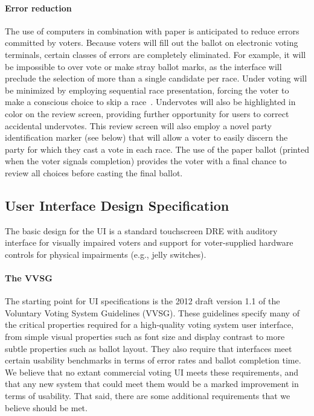 \paragraph{Error reduction} 
The use of computers in combination with paper is anticipated to reduce
errors committed by voters. Because voters will fill out the ballot on
electronic voting terminals, certain classes of errors are completely
eliminated. For example, it will be impossible to over vote or make
stray ballot marks, as the interface will preclude the selection of more
than a single candidate per race. Under voting will be minimized by
employing sequential race presentation, forcing the voter to make a
conscious choice to skip a race~\cite{greene-thesis}. Undervotes will
also be highlighted in color on the review screen, providing further
opportunity for users to correct accidental undervotes. This review
screen will also employ a novel party identification marker (see
below) that will allow a voter to easily discern the party for which
they cast a vote in each race. The use of the paper ballot (printed when
the voter signals completion) provides the voter with a final chance to
review all choices before casting the final ballot. 

\subsection{User Interface Design Specification}
The basic design for the UI is a standard touchscreen DRE with auditory interface for visually impaired voters and support for voter-supplied hardware controls for physical impairments (e.g., jelly switches).

\paragraph{The VVSG}
The starting point for UI specifications is the 2012 draft version 1.1 of the Voluntary Voting System Guidelines (VVSG). These guidelines specify many of the critical properties required for a high-quality voting system user interface, from simple visual properties such as font size and display contrast to more subtle properties such as ballot layout. They also require that interfaces meet certain usability benchmarks in terms of error rates and ballot completion time. We believe that no extant commercial voting UI meets these requirements, and that any new system that could meet them would be a marked improvement in terms of usability. That said, there are some additional requirements that we believe should be met. 

